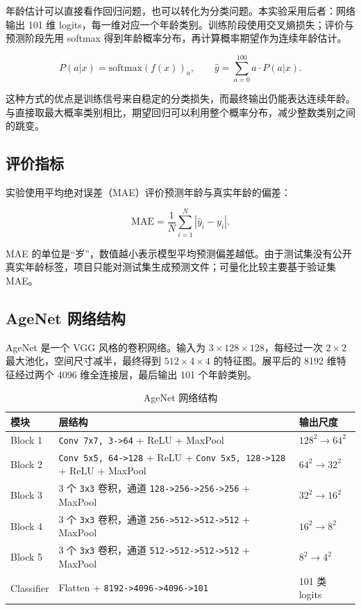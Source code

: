 \documentclass[12pt,a4paper,fontset=fandol]{ctexart}
\begin{document}
年龄估计可以直接看作回归问题，也可以转化为分类问题。本实验采用后者：网络输出 101 维 logits，每一维对应一个年龄类别。训练阶段使用交叉熵损失；评价与预测阶段先用 softmax 得到年龄概率分布，再计算概率期望作为连续年龄估计。

\[
P(a|x)=\mathrm{softmax}(f(x))_a,
\qquad
\hat{y}=\sum_{a=0}^{100}a\cdot P(a|x).
\]

这种方式的优点是训练信号来自稳定的分类损失，而最终输出仍能表达连续年龄。与直接取最大概率类别相比，期望回归可以利用整个概率分布，减少整数类别之间的跳变。

\subsection{评价指标}

实验使用平均绝对误差（MAE）评价预测年龄与真实年龄的偏差：

\[
\mathrm{MAE}=\frac{1}{N}\sum_{i=1}^{N}|\hat{y}_i-y_i|.
\]

MAE 的单位是“岁”，数值越小表示模型平均预测偏差越低。由于测试集没有公开真实年龄标签，项目只能对测试集生成预测文件；可量化比较主要基于验证集 MAE。

\subsection{AgeNet 网络结构}

AgeNet 是一个 VGG 风格的卷积网络。输入为 $3\times128\times128$，每经过一次 $2\times2$ 最大池化，空间尺寸减半，最终得到 $512\times4\times4$ 的特征图。展平后的 8192 维特征经过两个 4096 维全连接层，最后输出 101 个年龄类别。

\begin{table}[H]
  \centering
  \caption{AgeNet 网络结构}
  \label{tab:agenet}
  \begin{tabularx}{\textwidth}{p{2.1cm}X p{3.2cm}}
    \toprule
    模块 & 层结构 & 输出尺度 \\
    \midrule
    Block 1 & \texttt{Conv 7x7, 3->64} + ReLU + MaxPool & $128^2 \to 64^2$ \\
    Block 2 & \texttt{Conv 5x5, 64->128} + ReLU + \texttt{Conv 5x5, 128->128} + ReLU + MaxPool & $64^2 \to 32^2$ \\
    Block 3 & 3 个 \texttt{3x3} 卷积，通道 \texttt{128->256->256->256} + MaxPool & $32^2 \to 16^2$ \\
    Block 4 & 3 个 \texttt{3x3} 卷积，通道 \texttt{256->512->512->512} + MaxPool & $16^2 \to 8^2$ \\
    Block 5 & 3 个 \texttt{3x3} 卷积，通道 \texttt{512->512->512->512} + MaxPool & $8^2 \to 4^2$ \\
    Classifier & Flatten + \texttt{8192->4096->4096->101} & 101 类 logits \\
    \bottomrule
  \end{tabularx}
\end{table}
\end{document}
